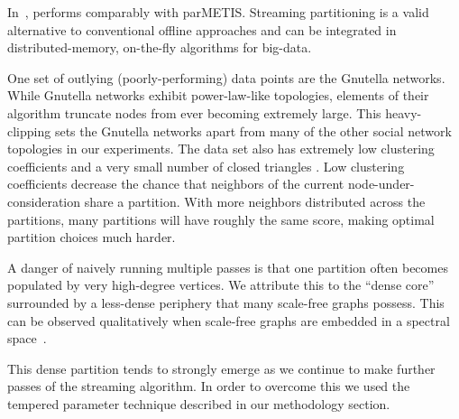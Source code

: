 In~, \ourmethod performs comparably with parMETIS.  
Streaming partitioning is a valid alternative to conventional offline approaches and can be integrated in distributed-memory, on-the-fly algorithms for big-data.

One set of outlying (poorly-performing) data points are the Gnutella networks.
While Gnutella networks exhibit power-law-like topologies, elements of their algorithm truncate nodes from ever becoming extremely large. 
This heavy-clipping sets the Gnutella networks apart from many of the other social network topologies in our experiments.
The data set also has extremely low clustering coefficients and a very small number of closed triangles \cite{Ripeanu:2002:MGN:613352.613670}. 
Low clustering coefficients decrease the chance that neighbors of the current node-under-consideration share a partition. 
With more neighbors distributed across the partitions, many partitions will have roughly the same score, making optimal partition choices much harder.

A danger of naively running multiple passes is that one partition often becomes populated by very high-degree vertices. 
We attribute this to the ``dense core'' surrounded by a less-dense periphery that many scale-free graphs possess.
This can be observed qualitatively when scale-free graphs are embedded in a spectral space~\cite{Lang04findinggood}.

This dense partition tends to strongly emerge as we continue to make further passes of the streaming algorithm.
In order to overcome this we used the tempered parameter technique described in our methodology section. 

